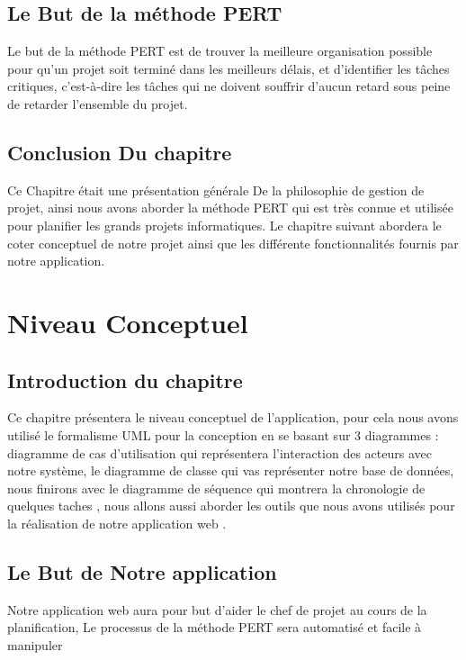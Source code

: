 \documentclass{report}
\begin{document}
\vspace*{\fill}

\section{Le But de la méthode PERT}
Le but de la méthode PERT est de trouver la meilleure organisation possible pour qu'un projet soit terminé dans les meilleurs délais, et d'identifier les tâches critiques, c'est-à-dire les tâches qui ne doivent souffrir d'aucun retard sous peine de retarder l'ensemble du projet.

\vspace*{\fill}

\section{Conclusion Du chapitre}
Ce Chapitre était une présentation générale De la philosophie de gestion de projet, ainsi nous avons aborder la méthode PERT qui est très connue et utilisée pour planifier les grands projets informatiques.
Le chapitre suivant abordera le coter conceptuel de notre projet ainsi que les différente fonctionnalités fournis par notre application.

\vspace*{\fill}

\chapter{Niveau Conceptuel}


\section{Introduction du chapitre}
Ce chapitre présentera le niveau conceptuel de l’application, pour cela nous avons utilisé le formalisme UML pour la conception en se basant sur 3 diagrammes : diagramme de cas d’utilisation qui représentera l’interaction des acteurs avec notre système, le diagramme de classe qui vas représenter notre base de données, nous finirons avec le diagramme de séquence qui montrera la chronologie de quelques taches , nous allons aussi aborder les outils que nous avons utilisés pour la réalisation de notre application web .

\vspace*{\fill}

\section{Le But de Notre application}
Notre application web aura pour but d’aider le chef de projet au cours de la planification, Le processus de la méthode PERT sera automatisé et facile à manipuler
\end{document}
